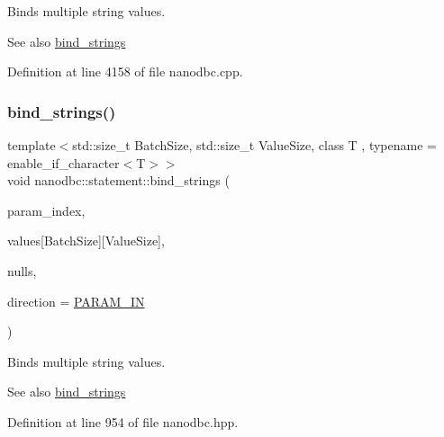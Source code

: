 Binds multiple string values. 

\begin{DoxySeeAlso}{See also}
\mbox{\hyperlink{group__bind__strings_ga8914c229f28ee7b02cf1b85684741326}{bind\+\_\+strings}} 
\end{DoxySeeAlso}


Definition at line 4158 of file nanodbc.\+cpp.

\mbox{\label{group__bind__strings_ga15d74df8689ffbc2543cd7453d32097b}} 
\subsubsection{\texorpdfstring{bind\_strings()}{bind\_strings()}\hspace{0.1cm}{\footnotesize\ttfamily [9/9]}}
{\footnotesize\ttfamily template$<$std\+::size\+\_\+t Batch\+Size, std\+::size\+\_\+t Value\+Size, class T , typename  = enable\+\_\+if\+\_\+character$<$\+T$>$$>$ \\
void nanodbc\+::statement\+::bind\+\_\+strings (\begin{DoxyParamCaption}\item[{short}]{param\+\_\+index,  }\item[{T const (\&)}]{values\mbox{[}\+Batch\+Size\mbox{]}\mbox{[}\+Value\+Size\mbox{]},  }\item[{bool const $\ast$}]{nulls,  }\item[{\mbox{\hyperlink{classnanodbc_1_1statement_a523142f53cbbee8d68a074da993e7fa6}{param\+\_\+direction}}}]{direction = {\ttfamily \mbox{\hyperlink{classnanodbc_1_1statement_a523142f53cbbee8d68a074da993e7fa6ae33f42ce0677d00c291ff4d8e39f99de}{P\+A\+R\+A\+M\+\_\+\+IN}}} }\end{DoxyParamCaption})\hspace{0.3cm}{\ttfamily [inline]}}



Binds multiple string values. 

\begin{DoxySeeAlso}{See also}
\mbox{\hyperlink{group__bind__strings_ga8914c229f28ee7b02cf1b85684741326}{bind\+\_\+strings}} 
\end{DoxySeeAlso}


Definition at line 954 of file nanodbc.\+hpp.

